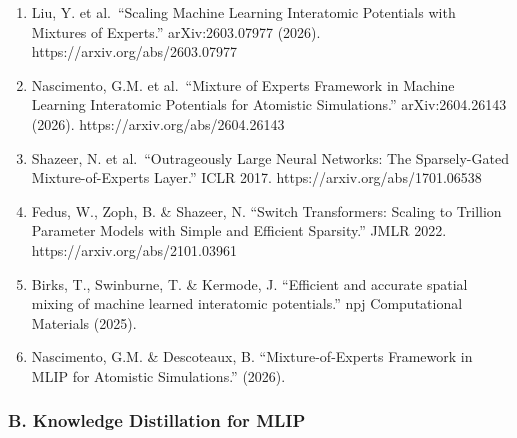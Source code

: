 \documentclass[
  12pt,
]{article}
\providecommand{\tightlist}{%
  \setlength{\itemsep}{0pt}\setlength{\parskip}{0pt}}
\begin{document}
\begin{enumerate}
\def\labelenumi{\arabic{enumi}.}
\tightlist
\item
  Liu, Y. et al.~``Scaling Machine Learning Interatomic Potentials with
  Mixtures of Experts.'' arXiv:2603.07977 (2026).
  https://arxiv.org/abs/2603.07977
\item
  Nascimento, G.M. et al.~``Mixture of Experts Framework in Machine
  Learning Interatomic Potentials for Atomistic Simulations.''
  arXiv:2604.26143 (2026). https://arxiv.org/abs/2604.26143
\item
  Shazeer, N. et al.~``Outrageously Large Neural Networks: The
  Sparsely-Gated Mixture-of-Experts Layer.'' ICLR 2017.
  https://arxiv.org/abs/1701.06538
\item
  Fedus, W., Zoph, B. \& Shazeer, N. ``Switch Transformers: Scaling to
  Trillion Parameter Models with Simple and Efficient Sparsity.'' JMLR
  2022. https://arxiv.org/abs/2101.03961
\item
  Birks, T., Swinburne, T. \& Kermode, J. ``Efficient and accurate
  spatial mixing of machine learned interatomic potentials.'' npj
  Computational Materials (2025).
\item
  Nascimento, G.M. \& Descoteaux, B. ``Mixture-of-Experts Framework in
  MLIP for Atomistic Simulations.'' (2026).
\end{enumerate}

\subsubsection{B. Knowledge Distillation for
MLIP}\label{b.-knowledge-distillation-for-mlip-1}
\end{document}
